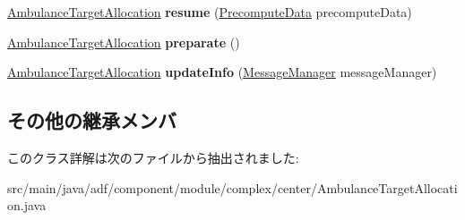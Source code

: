 \begin{DoxyCompactItemize}
\hyperlink{classadf_1_1component_1_1module_1_1complex_1_1center_1_1AmbulanceTargetAllocation}{Ambulance\+Target\+Allocation} {\bfseries resume} (\hyperlink{classadf_1_1agent_1_1precompute_1_1PrecomputeData}{Precompute\+Data} precompute\+Data)
\item 
\hypertarget{classadf_1_1component_1_1module_1_1complex_1_1center_1_1AmbulanceTargetAllocation_ac26b7e2b96ea7e6840e0c91975547940}{}\label{classadf_1_1component_1_1module_1_1complex_1_1center_1_1AmbulanceTargetAllocation_ac26b7e2b96ea7e6840e0c91975547940} 
\hyperlink{classadf_1_1component_1_1module_1_1complex_1_1center_1_1AmbulanceTargetAllocation}{Ambulance\+Target\+Allocation} {\bfseries preparate} ()
\item 
\hypertarget{classadf_1_1component_1_1module_1_1complex_1_1center_1_1AmbulanceTargetAllocation_a7e2b401a11a1021871b97390f89ad61f}{}\label{classadf_1_1component_1_1module_1_1complex_1_1center_1_1AmbulanceTargetAllocation_a7e2b401a11a1021871b97390f89ad61f} 
\hyperlink{classadf_1_1component_1_1module_1_1complex_1_1center_1_1AmbulanceTargetAllocation}{Ambulance\+Target\+Allocation} {\bfseries update\+Info} (\hyperlink{classadf_1_1agent_1_1communication_1_1MessageManager}{Message\+Manager} message\+Manager)
\end{DoxyCompactItemize}
\subsection*{その他の継承メンバ}


このクラス詳解は次のファイルから抽出されました\+:\begin{DoxyCompactItemize}
\item 
src/main/java/adf/component/module/complex/center/Ambulance\+Target\+Allocation.\+java\end{DoxyCompactItemize}
